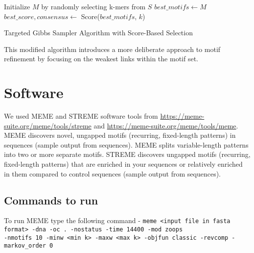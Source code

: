 \documentclass{report}
\begin{document}
\begin{algorithm}[H]
    \SetAlgoLined
    Initialize $M$ by randomly selecting k-mers from $S$\;
    $best\_motifs \gets M$\;
    $best\_score, consensus \gets$ Score($best\_motifs$, $k$)\;
    \;
    \caption{Targeted Gibbs Sampler Algorithm with Score-Based Selection}
\end{algorithm}

This modified algorithm introduces a more deliberate approach to motif refinement by focusing on the weakest links within the motif set.


\chapter{Software}
We used MEME and STREME software tools from \href{https://meme-suite.org/meme/tools/streme}{https://meme-suite.org/meme/tools/streme} and \href{https://meme-suite.org/meme/tools/meme}{https://meme-suite.org/meme/tools/meme}. MEME discovers novel, ungapped motifs (recurring, fixed-length patterns) in sequences (sample output from sequences). MEME splits variable-length patterns into two or more separate motifs. STREME discovers ungapped motifs (recurring, fixed-length patterns) that are enriched in your sequences or relatively enriched in them compared to control sequences (sample output from sequences).
    \section{Commands to run}
    To run MEME type the following command - \newline
    \texttt{meme <input file in fasta format> -dna -oc . -nostatus -time 14400 -mod zoops \\-nmotifs 10 -minw <min k> -maxw <max k> -objfun classic -revcomp -markov\_order 0}
\end{document}
